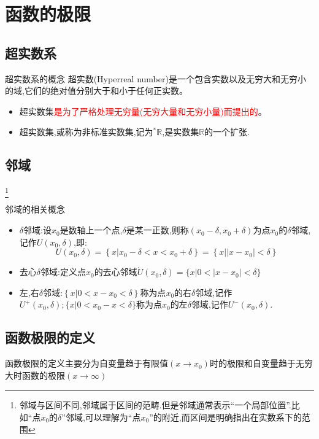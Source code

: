 \documentclass[8pt a4paper, oneside, UTF8]{ctexbook}
\begin{document}
\begin{sloppypar}
    \section{函数的极限}
    \subsection{超实数系}
    \begin{defn}{超实数系的概念}{}
        超实数(Hyperreal number)是一个包含实数以及无穷大和无穷小的域,它们的绝对值分别大于和小于任何正实数。
    \end{defn}
    \begin{criterion}{}{}
        \begin{itemize}
            \item 超实数集\textcolor{red}{是为了严格处理无穷量(无穷大量和无穷小量)而提出的}。
            \item 超实数集,或称为非标准实数集,记为$^{*}\mathbb{R}$,是实数集$\mathbb{R}$的一个扩张.
        \end{itemize}
    \end{criterion}
    \subsection{邻域}\footnote{邻域与区间不同,邻域属于区间的范畴.但是邻域通常表示“一个局部位置”.比如“点$x_0$的$\delta$”邻域,可以理解为“点$x_0$”的附近,而区间是明确指出在实数系下的范围}
    \begin{defn}{邻域的相关概念}{}
        \begin{itemize}
            \item $\delta$邻域:设$x_0$是数轴上一个点,$\delta$是某一正数,则称$(x_{0}-\delta,x_{0}+\delta)$为点$x_0$的$\delta$邻域,记作$U(x_{0},\delta)$,即:
                  $$
                      U(x_{0},\delta)=\left\{x|x_{0}-\delta<x<x_{0}+\delta\right\}=\left\{\left.x\right|\left|\left.x-x_{0}\right|<\delta\right\}\right.
                  $$
            \item 去心$\delta$邻域:定义点$x_0$的去心邻域$\mathring{U}(x_{0},\delta)=\bigl\{x|0<\bigl|x-x_{0}\bigr|<\delta\bigr\}$
            \item 左,右$\delta$邻域:$\left\{x|0<x-x_{0}<\delta\right\}$称为点$x_0$的右$\delta$邻域,记作$U^{+}(x_{0},\delta);\{x|0<x_{0}-x<\delta\}$称为点$x_0$的左$\delta$邻域,记作$U^{-}(x_{0},\delta).$
        \end{itemize}
    \end{defn}
    \subsection{函数极限的定义}
    函数极限的定义主要分为自变量趋于有限值$(x \to x_0)$时的极限和自变量趋于无穷大时函数的极限$(x \to \infty)$

\end{sloppypar}
\end{document}
